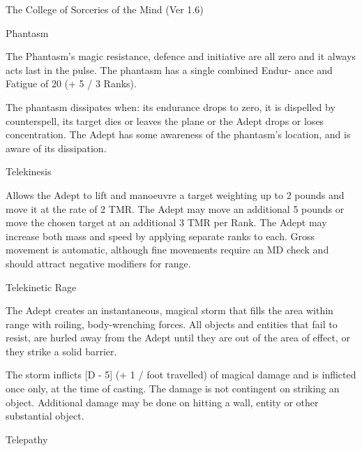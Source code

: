 \begin{Chapter}{The College of Sorceries of the Mind (Ver 1.6)}
\begin{spell}[S-6]{Phantasm}
\begin{effects}
The Phantasm’s magic resistance, defence and initiative are all zero
and it always acts last in the pulse. The phantasm has a single
combined Endur- ance and Fatigue of 20 (+ 5 / 3 Ranks).

The phantasm dissipates when: its endurance drops to zero, it is
dispelled by counterspell, its target dies or leaves the plane or the
Adept drops or loses concentration.  The Adept has some awareness of
the phantasm’s location, and is aware of its dissipation.
\end{effects}
\end{spell}

\begin{spell}[S-7]{Telekinesis}

\begin{effects}
Allows the Adept to lift and manoeuvre a target weighting up to 2
pounds and move it at the rate of 2 TMR. The Adept may move an
additional 5 pounds or move the chosen target at an additional 3 TMR
per Rank.  The Adept may increase both mass and speed by applying
separate ranks to each.  Gross movement is automatic, although fine
movements require an MD check and should attract negative modifiers
for range.
\end{effects}
\end{spell}

\begin{spell}[S-8]{Telekinetic Rage}

\begin{effects}
The Adept creates an instantaneous, magical storm that fills the area
within range with roiling, body-wrenching forces.  All objects and
entities that fail to resist, are hurled away from the Adept until
they are out of the area of effect, or they strike a solid barrier.

The storm inflicts [D - 5] (+ 1 / foot travelled) of magical damage
and is inflicted once only, at the time of casting.  The damage is not
contingent on striking an object. Additional damage may be done on
hitting a wall, entity or other substantial object.
\end{effects}
\end{spell}

\begin{spell}[S-9]{Telepathy}


\end{spell}
\end{Chapter}
